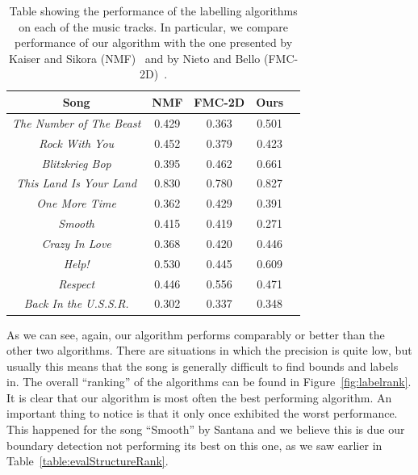 \begin{table}
\begin{center}
\begin{tabular}{| c | c | c | c | c | } \hline 
Song  											& 	NMF				&  FMC-2D		&  Ours		\\ \hline \hline
\textit{The Number of The Beast} 	&	0.429			& 	0.363  			&  0.501	\\ \hline
\textit{Rock With You}						&	0.452			&  0.379			&  0.423	\\ \hline
\textit{Blitzkrieg Bop} 						&	0.395			&  0.462  			&  0.661 	\\ \hline
\textit{This Land Is Your Land} 		&	0.830			&  0.780			&  0.827 	\\ \hline
\textit{One More Time}					&	0.362			&  0.429    			&  0.391 	\\ \hline
\textit{Smooth}								&	0.415			&  0.419  			&  0.271 	\\ \hline
\textit{Crazy In Love}						&	0.368			&  0.420  			&  0.446  	\\ \hline
\textit{Help!}									&	0.530			&  0.445		   	&  0.609 	\\ \hline
\textit{Respect}								&	0.446			&  0.556  			&  0.471 	\\ \hline
\textit{Back In the U.S.S.R.}				&	0.302			&  0.337 			&  0.348	\\ \hline

\end{tabular}
\caption{Table showing the performance of the labelling algorithms on each of the music tracks. In particular, we compare performance of our algorithm with the one presented by Kaiser and Sikora (NMF)~\cite{Sikora} and by Nieto and Bello (FMC-2D)~\cite{Bello}.}
\label{table:labellingnumeric}
\end{center}
\end{table}

As we can see, again, our algorithm performs comparably or better than the other two algorithms. There are situations in which the precision is quite low, but usually this means that the song is generally difficult to find bounds and labels in. The overall ``ranking'' of the algorithms can be found in Figure~\ref{fig:labelrank}. It is clear that our algorithm is most often the best performing algorithm. An important thing to notice is that it only once exhibited the worst performance. This happened for the song ``Smooth'' by Santana and we believe this is due our boundary detection not performing its best on this one, as we saw earlier in Table~\ref{table:evalStructureRank}.

